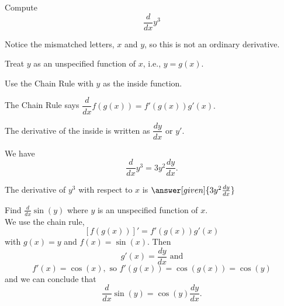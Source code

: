 \documentclass{ximera}
\begin{document}
\begin{question} %
  Compute
  \[
  \frac{d}{dx} y^3
  \]
  
	  \begin{hint}
		  Notice the mismatched letters, $x$ and $y$, so this is not an ordinary derivative.
    \end{hint}
		\begin{hint}
      Treat $y$ as an unspecified function of $x$, i.e., $y = g(x)$.
    \end{hint}
    \begin{hint}
      Use the Chain Rule with $y$ as the inside function.
    \end{hint}
    \begin{hint}
      The Chain Rule says $\dfrac{d}{dx} f(g(x)) = f'(g(x)) g'(x).$
    \end{hint}
		\begin{hint}
		  The derivative of the inside is written as $\dfrac{dy}{dx}$ or $y'$.
    \end{hint}
		\begin{hint}
      We have
      \[
      \frac{d}{dx} y^3 =  3y^2 \dfrac{dy}{dx}.
      \]
    \end{hint}
    
		The derivative of $y^3$ with respect to $x$ is
		 $\answer[given]{3y^2 \dd[y]{x}}$
		
\end{question}


  

\begin{example} %
Find $\frac{d}{dx} \sin(y)$ where $y$ is an unspecified function of $x$.\\
We use the chain rule,
\[\displaystyle{[f(g(x))]' = f'(g(x))g'(x)}\]
with $g(x) = y$ and $f(x) = \sin(x)$. Then 
\[g'(x) = \frac{dy}{dx} \text{ and}\]
\[f'(x) = \cos(x), \text{ so } f'(g(x)) = \cos(g(x)) = \cos(y)\]
and we can conclude that
\[\frac{d}{dx} \sin(y) = \cos(y) \frac{dy}{dx}.\]
\end{example}


\begin{center}
\begin{foldable}
\end{foldable}
\end{center}
\end{document}
